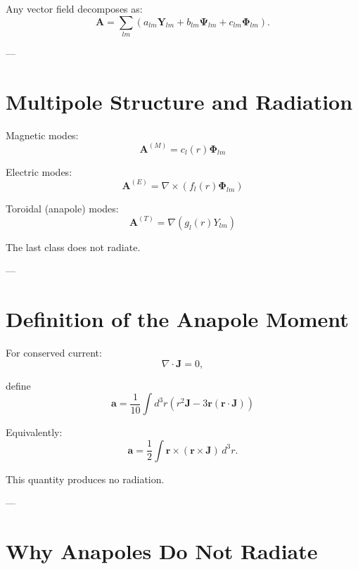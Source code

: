 \documentclass[11pt]{article}
\begin{document}
Any vector field decomposes as:
\begin{equation}
\mathbf{A} = \sum_{lm}
\left(
a_{lm}\mathbf{Y}_{lm}
+ b_{lm}\mathbf{\Psi}_{lm}
+ c_{lm}\mathbf{\Phi}_{lm}
\right).
\end{equation}

---

\section{Multipole Structure and Radiation}

Magnetic modes:
\begin{equation}
\mathbf{A}^{(M)} = c_l(r)\mathbf{\Phi}_{lm}
\end{equation}

Electric modes:
\begin{equation}
\mathbf{A}^{(E)} = \nabla \times (f_l(r)\mathbf{\Phi}_{lm})
\end{equation}

Toroidal (anapole) modes:
\begin{equation}
\mathbf{A}^{(T)} = \nabla(g_l(r)Y_{lm})
\end{equation}

The last class does not radiate.

---

\section{Definition of the Anapole Moment}

For conserved current:
\begin{equation}
\nabla \cdot \mathbf{J} = 0,
\end{equation}

define
\begin{equation}
\boxed{
\mathbf{a} = \frac{1}{10}
\int d^3r
\left(
r^2 \mathbf{J}
- 3\mathbf{r}(\mathbf{r}\cdot\mathbf{J})
\right)
}
\end{equation}

Equivalently:
\begin{equation}
\mathbf{a} = \frac12 \int \mathbf{r} \times (\mathbf{r} \times \mathbf{J})\, d^3r.
\end{equation}

This quantity produces no radiation.

---

\section{Why Anapoles Do Not Radiate}
\end{document}

